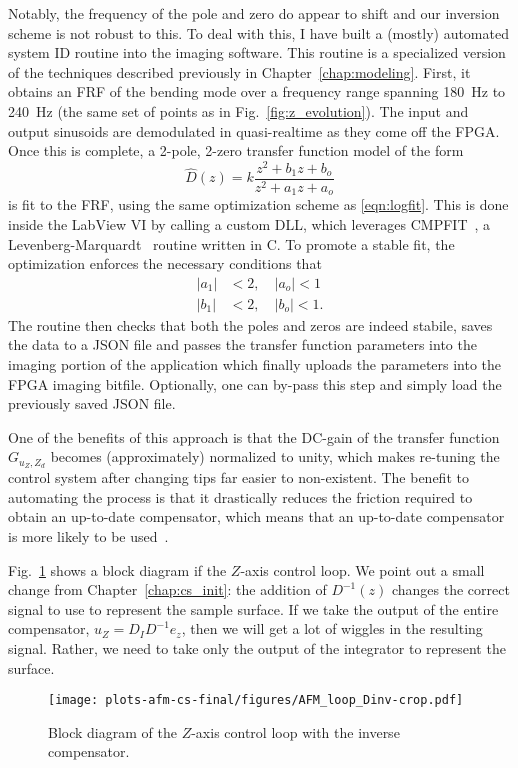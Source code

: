 Notably, the frequency of the pole and zero do appear to shift and our inversion scheme is not robust to this.
To deal with this, I have built a (mostly) automated system ID routine into the imaging software. This routine is a specialized version of the techniques described previously in Chapter~\ref{chap:modeling}. First, it obtains an FRF of the bending mode over a frequency range spanning 180~Hz to 240~Hz (the same set of points as in Fig.~\ref{fig:z_evolution}). The input and output sinusoids are demodulated in quasi-realtime as they come off the FPGA. Once this is complete, a 2-pole, 2-zero transfer function model of the form
\begin{equation*}
  \hat{D}(z) = k \frac{z^2 + b_1z + b_o}{z^2 + a_1z + a_o}
\end{equation*}
is fit to the FRF, using the same optimization scheme as \eqref{eqn:logfit}.
This is done inside the LabView VI by calling a custom DLL, which leverages CMPFIT~\cite{cmpfit,markwardt_mpfit_2009}, a Levenberg-Marquardt~\cite{more_levenberg_1978} routine written in C.
To promote a stable fit, the optimization enforces the necessary conditions that
\begin{align*}
  |a_1| &< 2, \quad  |a_o| < 1\\
  |b_1| &< 2, \quad  |b_o| < 1.
\end{align*}
The routine then checks that both the poles and zeros are indeed stabile, saves the data to a JSON file and passes the transfer function parameters into the imaging portion of the application which finally uploads the parameters into the FPGA imaging bitfile. Optionally, one can by-pass this step and simply load the previously saved JSON file.

One of the benefits of this approach is that the DC-gain of the transfer function $G_{u_Z,Z_d}$  becomes (approximately) normalized to unity, which makes re-tuning the control system after changing tips far easier to non-existent. The benefit to automating the process is that it drastically reduces the friction required to obtain an up-to-date compensator, which means that an up-to-date compensator is more likely to be used~\cite{abramovitch_25years_2015}.


Fig.~\ref{fig:afm_bd_dinv} shows a block diagram if the $Z$-axis control loop. We point out a small change from Chapter~\ref{chap:cs_init}: the addition of $D^{-1}(z)$ changes the correct signal to use to represent the sample surface. If we take the output of the entire compensator, $u_Z=D_ID^{-1}e_z$, then we will get a lot of wiggles in the resulting signal. Rather, we need to take only the output of the integrator to represent the surface. 
\begin{figure}
  \centering
  \texttt{[image: plots-afm-cs-final/figures/AFM\_loop\_Dinv-crop.pdf]}
  \caption{Block diagram of the $Z$-axis control loop with the inverse compensator. }
  \label{fig:afm_bd_dinv}
\end{figure}


